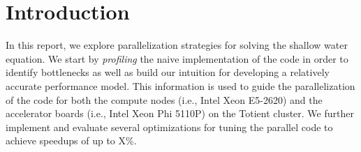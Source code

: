
\section{Introduction}
\label{sec-intro}

In this report, we explore parallelization strategies for solving the
shallow water equation. We start by \emph{profiling} the naive
implementation of the code in order to identify bottlenecks as well as
build our intuition for developing a relatively accurate performance
model. This information is used to guide the parallelization of the code
for both the compute nodes (i.e., Intel Xeon E5-2620) and the accelerator
boards (i.e., Intel Xeon Phi 5110P) on the Totient cluster. We further
implement and evaluate several optimizations for tuning the parallel code
to achieve speedups of up to X\%.
